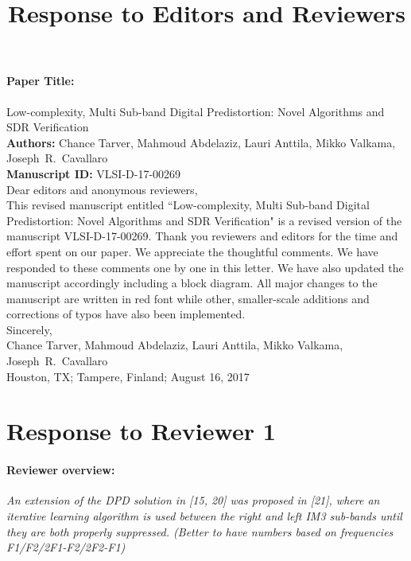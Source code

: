 \documentclass[]{article}
\title{Response to Editors and Reviewers}
\date{\vspace{-5ex}}
\author{\vspace{-5ex}}
\begin{document}
\maketitle

\paragraph{Paper Title:} Low-complexity, Multi Sub-band Digital Predistortion: Novel Algorithms and SDR Verification \\
\textbf{Authors:} Chance Tarver, Mahmoud Abdelaziz, Lauri Anttila, Mikko Valkama, Joseph~R.~Cavallaro\\
\textbf{Manuscript ID:} VLSI-D-17-00269\\

Dear editors and anonymous reviewers,\\


This revised manuscript entitled ``Low-complexity, Multi Sub-band Digital Predistortion: Novel Algorithms and SDR Verification" is a revised version of the manuscript VLSI-D-17-00269. 
Thank you reviewers and editors for the time and effort spent on our paper. We appreciate the thoughtful comments.
We have responded to these comments one by one in this letter. 
We have also updated the manuscript accordingly including a block diagram. 
All major changes to the manuscript are written in {\color{red} red font} while other, smaller-scale additions and corrections of typos have also been implemented.\\

Sincerely,\\

Chance Tarver, Mahmoud Abdelaziz, Lauri Anttila, Mikko Valkama, Joseph~R.~Cavallaro\\

Houston, TX; Tampere, Finland; August 16, 2017


\newpage
\section{Response to Reviewer 1}
\paragraph{Reviewer overview:} \textit{An extension of the DPD solution in [15, 20] was proposed in [21], where an iterative learning algorithm is used between the right and left IM3 sub-bands until they are both properly suppressed. (Better to have numbers based on frequencies F1/F2/2F1-F2/2F2-F1)}
\end{document}
